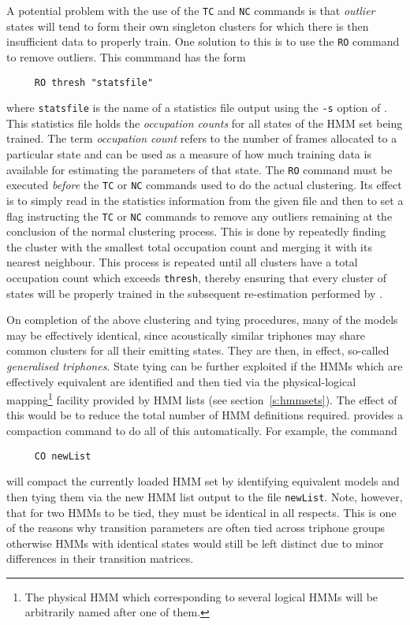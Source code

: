 A potential problem with the use of the \texttt{TC} and \texttt{NC} commands is
that {\it outlier} states will tend to form their own singleton 
clusters for
which there is then insufficient data to properly train.  One solution to
this is to use the \texttt{RO} command to 
remove outliers.  This commmand has
the form
\begin{verbatim}
     RO thresh "statsfile"
\end{verbatim}
where \texttt{statsfile} is the name of a statistics file output using the
\texttt{-s} option of .  This statistics file holds the 
{\em occupation counts} for all states of the HMM set being trained.  
The term {\em occupation count} refers to the number of frames allocated to a
particular state and can be used as a measure of how much training data is
available for estimating the parameters of that state.  
The \texttt{RO} command must be executed {\it before} the \texttt{TC} or
\texttt{NC} commands used to do the actual clustering. Its effect is to simply
read in the statistics information from the given file and then to set a flag
instructing the
\texttt{TC} or \texttt{NC} commands to remove any outliers remaining at 
the conclusion
of the normal clustering process.  This is done by repeatedly finding the
cluster with the smallest total occupation count and merging it with its
nearest neighbour. This process is repeated until all clusters have a total
occupation count which exceeds \texttt{thresh}, thereby ensuring that every
cluster of states will be properly trained in the subsequent re-estimation
performed by .


On completion of the above clustering and tying procedures, many of the models
may be effectively identical, since acoustically similar triphones may share
common clusters for all their emitting states.  They are then, in effect,
so-called {\it generalised triphones}. State tying
can be further exploited if the HMMs which are effectively equivalent are
identified and then tied via the physical-logical mapping\footnote{The physical
HMM which corresponding to several logical HMMs will be arbitrarily named after
one of them.} facility provided by HMM lists (see section~\ref{s:hmmsets}). The
effect of this would be to reduce the total number of HMM definitions required.
 provides a compaction command to do all of this automatically.
For example, the command
\begin{verbatim}
     CO newList 
\end{verbatim}
will compact 
the currently loaded HMM set by identifying equivalent models
and then tying them via the new HMM list output  to the 
file \texttt{newList}.  Note, however, that for two HMMs to be tied, they
must be identical in all respects.
This is one of the reasons why transition parameters are often tied
across triphone groups otherwise HMMs with identical states would still
be left distinct due to minor differences in their transition matrices.

